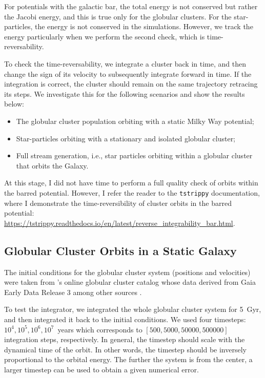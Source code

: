     For potentials with the galactic bar, the total energy is not conserved but rather the Jacobi energy, and this is true only for the globular clusters. For the star-particles, the energy is not conserved in the simulations. However, we track the energy particularly when we perform the second check, which is time-reversability.

    To check the time-reversability, we integrate a cluster back in time, and then change the sign of its velocity to subsequently integrate forward in time. If the integration is correct, the cluster should remain on the same trajectory retracing its steps. We investigate this for the following scenarios and show the results below: 
    \begin{itemize}
        \item The globular cluster population orbiting with a static Milky Way potential;
        \item Star-particles orbiting with a stationary and isolated globular cluster;
        \item Full stream generation, i.e., star particles orbiting within a globular cluster that orbits the Galaxy.
    \end{itemize}

    At this stage, I did not have time to perform a full quality check of orbits within the barred potential. However, I refer the reader to the \texttt{tstrippy} documentation, where I demonstrate the time-reversibility of cluster orbits in the barred potential: \url{https://tstrippy.readthedocs.io/en/latest/reverse_integrability_bar.html}.
    



    \subsection{Globular Cluster Orbits in a Static Galaxy}
        The initial conditions for the globular cluster system (positions and velocities) were taken from \citet{2018MNRAS.478.1520B}'s online globular cluster catalog whose data derived from Gaia Early Data Release 3 among other sources \citep{2021MNRAS.505.5957B,2021A&A...649A...1G,2023A&A...674A...1G}. 

        To test the integrator, we integrated the whole globular cluster system for 5~Gyr, and then integrated it back to the initial conditions. We used four timesteps: $10^4,10^5,10^6,10^7$~years which corresponds to $\left[500,5000,50000,500000\right]$ integration steps, respectively. In general, the timestep should scale with the dynamical time of the orbit. In other words, the timestep should be inversely proportional to the orbital energy. The further the system is from the center, a larger timestep can be used to obtain a given numerical error. 
        
